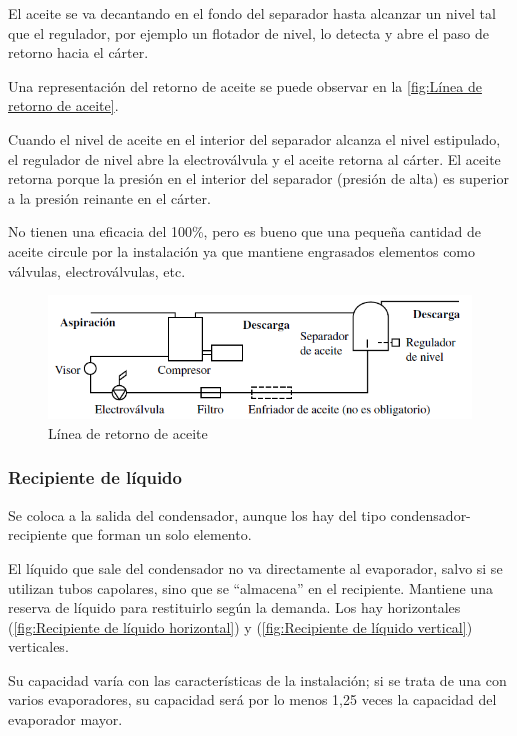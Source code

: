 El aceite se va decantando en el fondo del separador hasta alcanzar un nivel tal que el regulador, por ejemplo un flotador de nivel, lo detecta y abre el paso de retorno hacia el cárter.

Una representación del retorno de aceite se puede observar en la \autoref{fig:Línea de retorno de aceite}.


Cuando el nivel de aceite en el interior del separador alcanza el nivel estipulado, el regulador de nivel abre la electroválvula y el aceite retorna al cárter. El aceite retorna porque la presión en el interior del separador (presión de alta) es superior a la presión reinante en el cárter.

No tienen una eficacia del 100\%, pero es bueno que una pequeña cantidad de aceite circule por la instalación ya que mantiene engrasados elementos como válvulas, electroválvulas, etc.

\begin{figure}[h]
	\centering
	\includegraphics[width=.9\linewidth]{figuras/Linea de retorno de aceite.png}
	\caption{Línea de retorno de aceite}
	\label{fig:Línea de retorno de aceite}
\end{figure}

\subsubsection{Recipiente de líquido}

Se coloca a la salida del condensador, aunque los hay del tipo condensador-recipiente que forman un solo elemento.

El líquido que sale del condensador no va directamente al evaporador, salvo si se utilizan tubos capolares, sino que se ``almacena'' en el recipiente. Mantiene una reserva de líquido para restituirlo según la demanda. Los hay horizontales (\autoref{fig:Recipiente de líquido horizontal}) y (\autoref{fig:Recipiente de líquido vertical}) verticales.

Su capacidad varía con las características de la instalación; si se trata de una con varios evaporadores, su capacidad será por lo menos 1,25 veces la capacidad del evaporador mayor.

